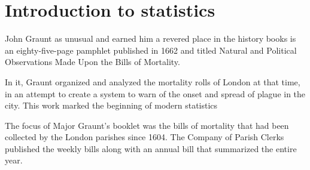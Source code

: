 \chapter{Introduction to statistics}
%




John Graunt as unusual and earned him a revered place in the history books is an eighty-five-page pamphlet published in 1662 and titled Natural and Political Observations Made Upon the Bills of Mortality.

In it, Graunt organized and analyzed the mortality rolls of London at that time, in an attempt to create a system to warn of the onset and spread of plague in the city. This work marked the beginning of modern statistics

The focus of Major Graunt’s booklet was the bills of mortality that had been collected by the London parishes since 1604. The Company of Parish Clerks published the weekly bills along with an annual bill that summarized the entire year.

